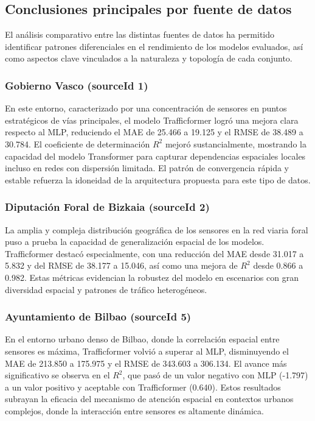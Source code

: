 \subsection{Conclusiones principales por fuente de datos}
\label{sec:concl_fue_dat}

El análisis comparativo entre las distintas fuentes de datos ha permitido identificar patrones diferenciales en el rendimiento de los modelos evaluados, así como aspectos clave vinculados a la naturaleza y topología de cada conjunto.

\subsubsection*{Gobierno Vasco (sourceId 1)}  
En este entorno, caracterizado por una concentración de sensores en puntos estratégicos de vías principales, el modelo Trafficformer logró una mejora clara respecto al MLP, reduciendo el MAE de 25.466 a 19.125 y el RMSE de 38.489 a 30.784. El coeficiente de determinación $R^2$ mejoró sustancialmente, mostrando la capacidad del modelo Transformer para capturar dependencias espaciales locales incluso en redes con dispersión limitada. El patrón de convergencia rápida y estable refuerza la idoneidad de la arquitectura propuesta para este tipo de datos.

\subsubsection*{Diputación Foral de Bizkaia (sourceId 2)}  
La amplia y compleja distribución geográfica de los sensores en la red viaria foral puso a prueba la capacidad de generalización espacial de los modelos. Trafficformer destacó especialmente, con una reducción del MAE desde 31.017 a 5.832 y del RMSE de 38.177 a 15.046, así como una mejora de $R^2$ desde 0.866 a 0.982. Estas métricas evidencian la robustez del modelo en escenarios con gran diversidad espacial y patrones de tráfico heterogéneos.

\subsubsection*{Ayuntamiento de Bilbao (sourceId 5)}  
En el entorno urbano denso de Bilbao, donde la correlación espacial entre sensores es máxima, Trafficformer volvió a superar al MLP, disminuyendo el MAE de 213.850 a 175.975 y el RMSE de 343.603 a 306.134. El avance más significativo se observa en el $R^2$, que pasó de un valor negativo con MLP (-1.797) a un valor positivo y aceptable con Trafficformer (0.640). Estos resultados subrayan la eficacia del mecanismo de atención espacial en contextos urbanos complejos, donde la interacción entre sensores es altamente dinámica.


